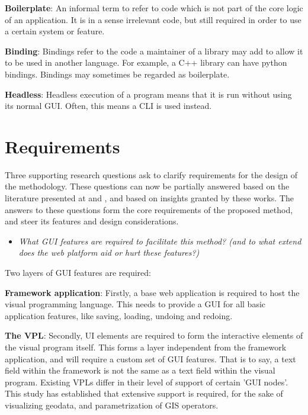 \textbf{Boilerplate}: An informal term to refer to code which is not part of the core logic of an application. It is in a sense irrelevant code, but still required in order to use a certain system or feature. 

\textbf{Binding}: Bindings refer to the code a maintainer of a library may add to allow it to be used in another language. For example, a C++ library can have python bindings. 
Bindings may sometimes be regarded as boilerplate.

\textbf{Headless}: Headless execution of a program means that it is run without using its normal \ac{GUI}. 
Often, this means a \ac{CLI} is used instead.

\section{Requirements}
\label{sec:method:require}

Three supporting research questions ask to clarify requirements for the design of the methodology. 
These questions can now be partially answered based on the literature presented at  and , and based on insights granted by these works.
The answers to these questions form the core requirements of the proposed method, and steer its features and design considerations.

\begin{itemize}[ ]
  \item \emph{What GUI features are required to facilitate this method? (and to what extend does the
  web platform aid or hurt these features?)}  
\end{itemize}

Two layers of \ac{GUI} features are required:

\textbf{Framework application}: Firstly, a base web application is required to host the visual programming language.
This needs to provide a \ac{GUI} for all basic application features, like saving, loading, undoing and redoing.

\textbf{The VPL}: Secondly, UI elements are required to form the interactive elements of the visual program itself. 
This forms a layer independent from the framework application, and will require a custom set of \ac{GUI} features. 
That is to say, a text field within the framework is not the same as a text field within the visual program.
Existing VPLs differ in their level of support of certain '\ac{GUI} nodes'.
This study has established that extensive support is required, for the sake of visualizing geodata, and parametrization of \ac{GIS} operators.

